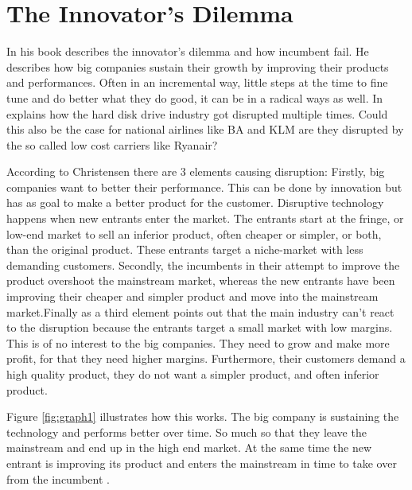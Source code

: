 \documentclass[a4paper, 11pt]{article}
\begin{document}
\label{sec:this-is-a-section}

\section{The Innovator's Dilemma}


In his book \cite{Christensen97} describes the innovator's dilemma and how incumbent fail. He describes how big companies sustain their growth by improving their products and performances. Often in an incremental way, little steps at the time to fine tune and do better what they do good, it can be in a radical ways as well. In \citep{Christensen97} explains how the hard disk drive industry got disrupted multiple times. Could this also be the case for national airlines like BA and KLM are they disrupted by the so called low cost carriers like Ryanair?

According to Christensen \cite{Christensen97} there are 3 elements causing disruption: Firstly, big companies want to better their performance. This can be done by innovation but has as goal to make a better product for the customer. Disruptive technology happens when new entrants enter the market. The entrants start at the fringe, or low-end market to sell an inferior product, often cheaper or simpler, or both, than the original product. These entrants target a niche-market with less demanding customers. Secondly, the incumbents in their attempt to improve the product overshoot the mainstream market, whereas the new entrants have been improving their cheaper and simpler product and move into the mainstream market.Finally as a third element \cite{Christensen97} points out that the main industry can't react to the disruption because the entrants target a small market with low margins. This is of no interest to the big companies. They need to grow and make more profit, for that they need higher margins. Furthermore, their customers demand a high quality product, they do not want a simpler product, and often inferior product.

Figure \ref{fig:graph1} illustrates how this works. The big company is sustaining the technology and performs better over time. So much so that they leave the mainstream and end up in the high end market. At the same time the new entrant is improving its product and enters the mainstream in time to take over from the incumbent \cite{Christensen97}.
\end{document}
